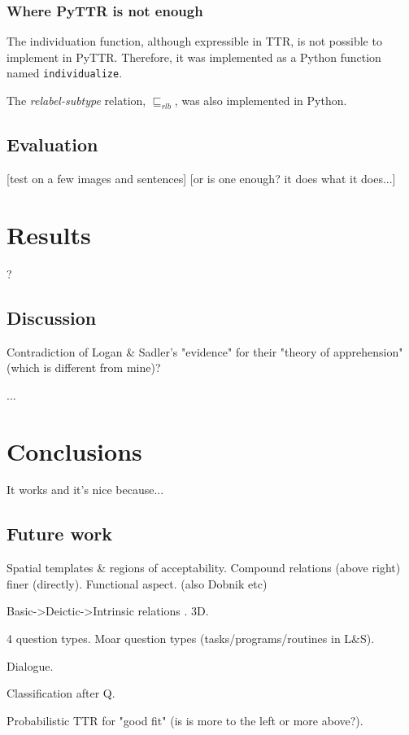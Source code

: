 \documentclass[11pt, a4paper]{article}
\begin{document}
\subsubsection{Where PyTTR is not enough}

The individuation function, although expressible in TTR, is not possible to implement in PyTTR.
Therefore, it was implemented as a Python function named {\tt individualize}.

The \textit{relabel-subtype} relation, $\sqsubseteq_{rlb}$, was also implemented in Python.



\subsection{Evaluation}

[test on a few images and sentences] [or is one enough? it does what it does...]



\section{Results}
\label{sec:results}

?



\subsection{Discussion}
\label{sec:discussion}

Contradiction of Logan \& Sadler's "evidence" for their "theory of apprehension" (which is different from mine)?

...



\section{Conclusions}
\label{sec:conclusions}

It works and it's nice because...



\subsection{Future work}

Spatial templates \& regions of acceptability. Compound relations (above right) finer (directly). Functional aspect.  \cite{LoganComputationalAnalysisApprehension1996} (also Dobnik etc)

Basic->Deictic->Intrinsic relations  \cite{LoganComputationalAnalysisApprehension1996}. 3D.

4 question types.
Moar question types (tasks/programs/routines in L\&S).

Dialogue.

Classification after Q.

Probabilistic TTR for "good fit" (is is more to the left or more above?).




\end{document}

